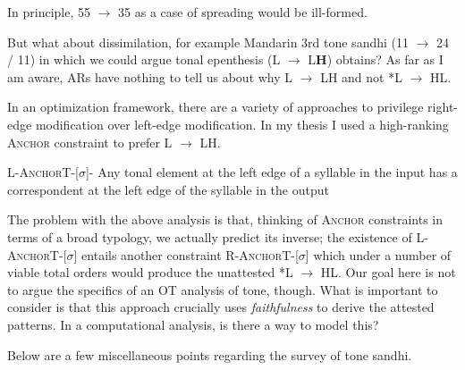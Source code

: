 \documentclass{article}
\begin{document}
In principle, 55 $\rightarrow$ 35 as a case of spreading would be ill-formed.
\begin{exe}
\ex
{}
\end{exe}
But what about dissimilation, for example Mandarin 3rd tone sandhi (11 $\rightarrow$ 24 / \underline{\hspace{1em}} 11) in which we could argue tonal epenthesis (L $\rightarrow$ L\textbf{H}) obtains? As far as I am aware, ARs have nothing to tell us about why L $\rightarrow$ LH and not *L $\rightarrow$ HL. \par   
In an optimization framework, there are a variety of approaches to privilege right-edge modification over left-edge modification. In my thesis I used a high-ranking \textsc{Anchor} constraint to prefer L $\rightarrow$ LH.
\begin{exe}
\ex
L-\textsc{AnchorT}-[$\sigma$]- Any tonal element at the left edge of a syllable in the input has a correspondent at the left edge of the syllable in the output
\end{exe}
The problem with the above analysis is that, thinking of \textsc{Anchor} constraints in terms of a broad typology, we actually predict its inverse; the existence of L-\textsc{AnchorT}-[$\sigma$] entails another constraint R-\textsc{AnchorT}-[$\sigma$] which under a number of viable total orders would produce the unattested *L $\rightarrow$ HL. Our goal here is not to argue the specifics of an OT analysis of tone, though. What is important to consider is that this approach crucially uses \emph{faithfulness} to derive the attested patterns. In a computational analysis, is there a way to model this? \par
Below are a few miscellaneous points regarding the survey of tone sandhi.
\end{document}
